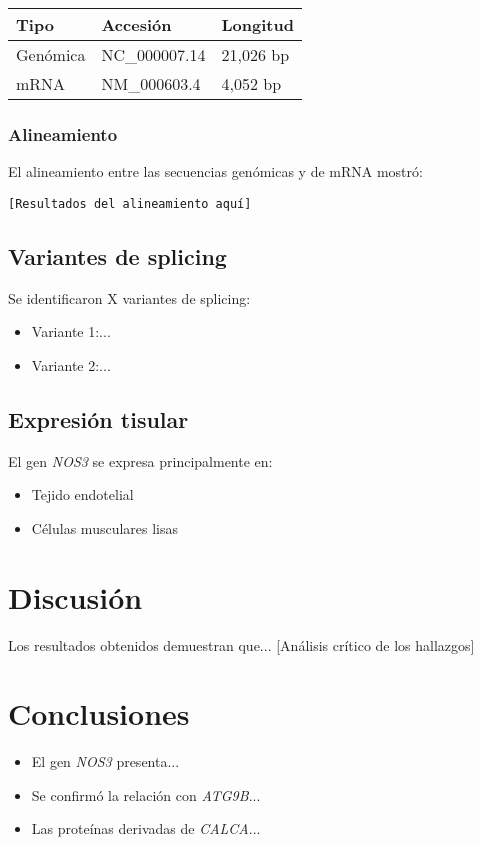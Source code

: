 \documentclass[12pt, a4paper]{article}
\begin{document}
\begin{longtable}{lll}
\toprule
Tipo & Accesión & Longitud \\
\midrule
Genómica & NC\_000007.14 & 21,026 bp \\
mRNA & NM\_000603.4 & 4,052 bp \\
\bottomrule
\end{longtable}

\subsubsection{Alineamiento}
El alineamiento entre las secuencias genómicas y de mRNA mostró:

\begin{verbatim}
[Resultados del alineamiento aquí]
\end{verbatim}

\subsection{Variantes de splicing}
Se identificaron X variantes de splicing:

\begin{itemize}
\item Variante 1:...
\item Variante 2:...
\end{itemize}

\subsection{Expresión tisular}
El gen \textit{NOS3} se expresa principalmente en:

\begin{itemize}
\item Tejido endotelial
\item Células musculares lisas
\end{itemize}

\section{Discusión}

Los resultados obtenidos demuestran que... [Análisis crítico de los hallazgos]

\section{Conclusiones}

\begin{itemize}
\item El gen \textit{NOS3} presenta...
\item Se confirmó la relación con \textit{ATG9B}...
\item Las proteínas derivadas de \textit{CALCA}...
\end{itemize}
\end{document}
